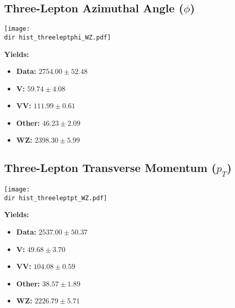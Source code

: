 \documentclass[a4paper,12pt]{article}
\newcommand{\dir}{HZZ-ResultsCL-ibrahim_analysis-03.05.2025_11h/}
\begin{document}
\subsection*{Three-Lepton Azimuthal Angle ($\phi$)}
\begin{minipage}{0.6\textwidth}
    \centering
    \texttt{[image: \\dir hist\_threeleptphi\_WZ.pdf]}
    \label{fig:threeleptphi}
\end{minipage}%
\begin{minipage}{0.4\textwidth}
    \textbf{Yields:}
    \begin{itemize}
        \item \textbf{Data:} $2754.00 \pm 52.48$
        \item \textbf{V:} $59.74 \pm 4.08$
        \item \textbf{VV:} $111.99 \pm 0.61$
        \item \textbf{Other:} $46.23 \pm 2.09$
        \item \textbf{WZ:} $2398.30 \pm 5.99$
    \end{itemize}
\end{minipage}

\subsection*{Three-Lepton Transverse Momentum ($p_T$)}
\begin{minipage}{0.6\textwidth}
    \centering
    \texttt{[image: \\dir hist\_threeleptpt\_WZ.pdf]}
    \label{fig:threeleptpt}
\end{minipage}%
\begin{minipage}{0.4\textwidth}
    \textbf{Yields:}
    \begin{itemize}
        \item \textbf{Data:} $2537.00 \pm 50.37$
        \item \textbf{V:} $49.68 \pm 3.70$
        \item \textbf{VV:} $104.08 \pm 0.59$
        \item \textbf{Other:} $38.57 \pm 1.89$
        \item \textbf{WZ:} $2226.79 \pm 5.71$
    \end{itemize}
\end{minipage}
\end{document}
